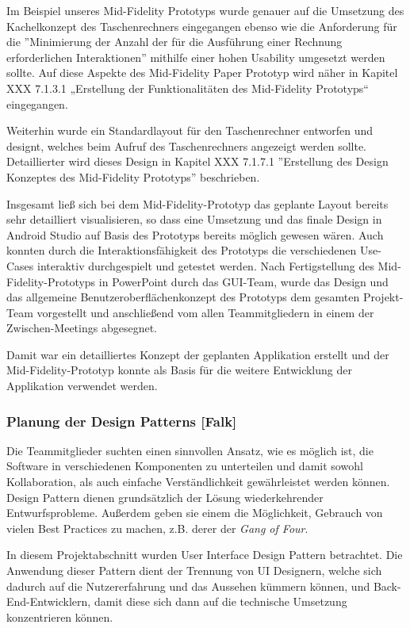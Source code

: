 
Im Beispiel unseres Mid-Fidelity Prototyps wurde genauer auf die Umsetzung des Kachelkonzept des Taschenrechners eingegangen ebenso wie die Anforderung für die ''Minimierung der Anzahl der für die Ausführung einer Rechnung erforderlichen Interaktionen'' mithilfe einer hohen Usability umgesetzt werden sollte. Auf diese Aspekte des Mid-Fidelity Paper Prototyp wird näher in Kapitel XXX 7.1.3.1	„Erstellung der Funktionalitäten des Mid-Fidelity Prototyps“ eingegangen. 

Weiterhin wurde ein Standardlayout für den Taschenrechner entworfen und designt, welches beim Aufruf des Taschenrechners angezeigt werden sollte. Detaillierter wird dieses Design in Kapitel XXX 7.1.7.1	''Erstellung des Design Konzeptes des Mid-Fidelity Prototyps'' beschrieben. 

Insgesamt ließ sich bei dem Mid-Fidelity-Prototyp das geplante Layout bereits sehr detailliert visualisieren, so dass eine Umsetzung und das finale Design in Android Studio auf Basis des Prototyps bereits möglich gewesen wären. Auch konnten durch die Interaktionsfähigkeit des Prototyps die verschiedenen Use-Cases interaktiv durchgespielt und getestet werden. Nach Fertigstellung des Mid-Fidelity-Prototyps in PowerPoint durch das GUI-Team, wurde das Design und das allgemeine Benutzeroberflächenkonzept des Prototyps dem gesamten Projekt-Team vorgestellt und anschließend vom allen Teammitgliedern in einem der Zwischen-Meetings abgesegnet. 

Damit war ein detailliertes Konzept der geplanten Applikation erstellt und der Mid-Fidelity-Prototyp konnte als Basis für die weitere Entwicklung der Applikation verwendet werden. 

\clearpage

\subsubsection{Planung der Design Patterns [Falk]}

Die Teammitglieder suchten einen sinnvollen Ansatz, wie es möglich ist, die Software in verschiedenen Komponenten zu unterteilen und damit sowohl Kollaboration, als auch einfache Verständlichkeit gewährleistet werden können. Design Pattern dienen grundsätzlich der Lösung wiederkehrender Entwurfsprobleme. Außerdem geben sie einem die Möglichkeit, Gebrauch von vielen Best Practices zu machen, z.B. derer der \textit{Gang of Four}. 

In diesem Projektabschnitt wurden User Interface Design Pattern betrachtet. Die Anwendung dieser Pattern dient der Trennung von UI Designern, welche sich dadurch auf die Nutzererfahrung und das Aussehen kümmern können, und Back-End-Entwicklern, damit diese sich dann auf die technische Umsetzung konzentrieren können. 

